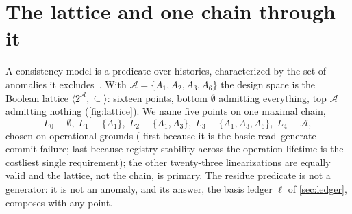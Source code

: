 \section{The lattice and one chain through it}
\label{sec:lattice}

A consistency model is a predicate over histories, characterized by the set of
anomalies it excludes~\cite{Adya1999}. With
$\mathcal{A}=\{A_1,A_2,A_3,A_6\}$ the design space is the Boolean lattice
$\langle 2^{\mathcal{A}},\subseteq\rangle$: sixteen points, bottom
$\emptyset$ admitting everything, top $\mathcal{A}$ admitting nothing
(\cref{fig:lattice}). We name five points on one maximal chain,
\[
  L_0\equiv\emptyset,\;
  L_1\equiv\{A_1\},\;
  L_2\equiv\{A_1,A_3\},\;
  L_3\equiv\{A_1,A_3,A_6\},\;
  L_4\equiv\mathcal{A},
\]
chosen on operational grounds ( first because it is the basic
read--generate--commit failure;  last because registry stability across
the operation lifetime is the costliest single requirement); the other
twenty-three linearizations are equally valid and the lattice, not the chain,
is primary. The residue predicate \Rp{} is not a generator: it is not an
anomaly, and its answer, the basis ledger $\ell$ of \cref{sec:ledger},
composes with any point.


